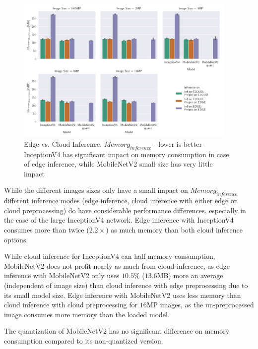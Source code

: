 \begin{figure}[!htb]
\centering
\includegraphics[width=0.95\textwidth]{./Bilder/single_plots/edge_vs_cloud_plots/Edge_vs_Cloud_Inference_Inference_Memory.pdf}
\caption[{Edge vs. Cloud Inference:  $Memory_{inference}$ - lower is better}]{Edge vs. Cloud Inference:  $Memory_{inference}$ - lower is better - InceptionV4 has significant impact on memory consumption in case of edge inference, while MobileNetV2 small size has very little impact}
\label{fig:EdgeVsCloudInferenceMemory}
\end{figure}

While the different images sizes only have a small impact on $Memory_{inference}$ different inference modes (edge inference, cloud inference with either edge or cloud preprocessing) do have considerable performance differences, especially in the case of the large InceptionV4 network.
Edge inference with InceptionV4 consumes more than twice ($2.2\times$) as much memory than both cloud inference options.

While cloud inference for InceptionV4 can half memory consumption, MobileNetV2 does not profit nearly as much from cloud inference, as edge inference with MobileNetV2 only uses $10.5\%$ ($13.6$MB) more an average (independent of image size) than cloud inference with edge preprocessing due to its small model size.
Edge inference with MobileNetV2 uses less memory than cloud inference with cloud preprocessing for $16$MP images, as the un-preprocessed image consumes more memory than the loaded model. 

The quantization of MobileNetV2 has no significant difference on memory consumption compared to its non-quantized version.


